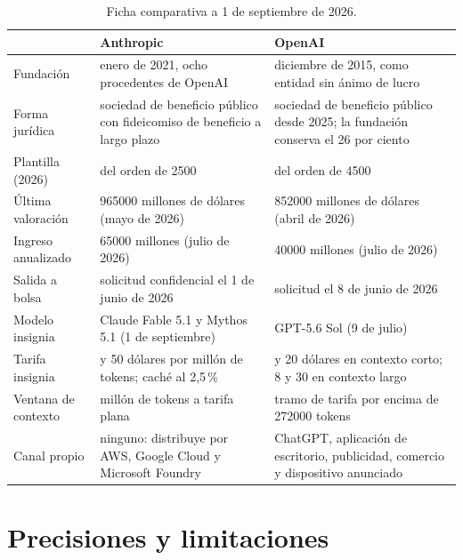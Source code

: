 \documentclass[11pt,letterpaper]{article}
\begin{document}
\begin{table}[tbp]
  \centering
  \small
  \setlength{\tabcolsep}{4.5pt}
  \caption{Ficha comparativa a 1 de septiembre de 2026.}
  \label{tab:ficha}
  \begin{tabularx}{\textwidth}{@{}>{\raggedright\arraybackslash}p{}
    >{\raggedright\arraybackslash}X >{\raggedright\arraybackslash}X@{}}
    \toprule
    & \textbf{Anthropic} & \textbf{OpenAI} \\
    \midrule
    Fundación & enero de 2021, ocho procedentes de OpenAI
      & diciembre de 2015, como entidad sin ánimo de lucro \\
    Forma jurídica & sociedad de beneficio público con fideicomiso de
      beneficio a largo plazo
      & sociedad de beneficio público desde 2025; la fundación conserva el
        26 por ciento \\
    Plantilla (2026) & del orden de \num{2500} & del orden de \num{4500} \\
    Última valoración & \num{965000} millones de dólares (mayo de 2026)
      & \num{852000} millones de dólares (abril de 2026) \\
    Ingreso anualizado & \num{65000} millones (julio de 2026)
      & \num{40000} millones (julio de 2026) \\
    Salida a bolsa & solicitud confidencial el 1 de junio de 2026
      & solicitud el 8 de junio de 2026 \\
    Modelo insignia & Claude Fable 5.1 y Mythos 5.1 (1 de septiembre)
      & GPT-5.6 Sol (9 de julio) \\
    Tarifa insignia & 10 y 50 dólares por millón de tokens; caché al 2,5\,\%
      & 4 y 20 dólares en contexto corto; 8 y 30 en contexto largo \\
    Ventana de contexto & 1 millón de tokens a tarifa plana
      & tramo de tarifa por encima de \num{272000} tokens \\
    Canal propio & ninguno: distribuye por AWS, Google Cloud y Microsoft
      Foundry
      & ChatGPT, aplicación de escritorio, publicidad, comercio y dispositivo
        anunciado \\
    \bottomrule
  \end{tabularx}
\end{table}

\section{Precisiones y limitaciones}
\end{document}
